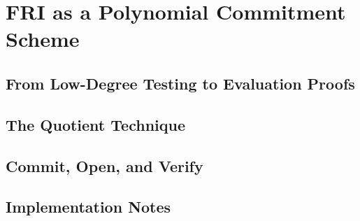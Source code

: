 \chapter{FRI as a Polynomial Commitment Scheme}
\label{ch:pcs}

\section{From Low-Degree Testing to Evaluation Proofs}
\section{The Quotient Technique}
\section{Commit, Open, and Verify}
\section{Implementation Notes}